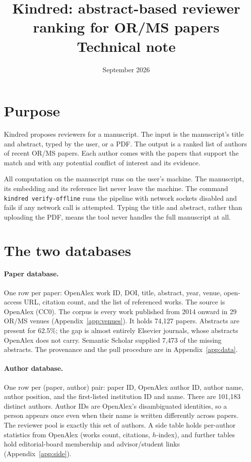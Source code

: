 \documentclass[11pt]{article}
\title{Kindred: abstract-based reviewer ranking for OR/MS papers\\[2pt]\large Technical note}
\author{}
\date{September 2026}
\begin{document}
\maketitle

\section{Purpose}
Kindred proposes reviewers for a manuscript. The input is the manuscript's title and abstract, typed by the user, or a PDF. The output is a ranked list of authors of recent OR/MS papers. Each author comes with the papers that support the match and with any potential conflict of interest and its evidence.

All computation on the manuscript runs on the user's machine. The manuscript, its embedding and its reference list never leave the machine. The command \texttt{kindred verify-offline} runs the pipeline with network sockets disabled and fails if any network call is attempted. Typing the title and abstract, rather than uploading the PDF, means the tool never handles the full manuscript at all.

\section{The two databases}
\paragraph{Paper database.} One row per paper: OpenAlex work ID, DOI, title, abstract, year, venue, open-access URL, citation count, and the list of referenced works. The source is OpenAlex (CC0). The corpus is every work published from 2014 onward in 29 OR/MS venues (Appendix~\ref{app:venues}). It holds 74{,}127 papers. Abstracts are present for 62.5\%; the gap is almost entirely Elsevier journals, whose abstracts OpenAlex does not carry. Semantic Scholar supplied 7{,}473 of the missing abstracts. The provenance and the pull procedure are in Appendix~\ref{app:data}.

\paragraph{Author database.} One row per (paper, author) pair: paper ID, OpenAlex author ID, author name, author position, and the first-listed institution ID and name. There are 101{,}183 distinct authors. Author IDs are OpenAlex's disambiguated identities, so a person appears once even when their name is written differently across papers. The reviewer pool is exactly this set of authors. A side table holds per-author statistics from OpenAlex (works count, citations, $h$-index), and further tables hold editorial-board membership and advisor/student links (Appendix~\ref{app:side}).
\end{document}
